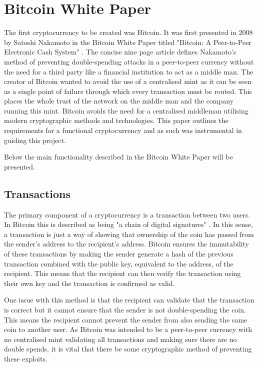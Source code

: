 \documentclass{l4proj}
\begin{document}
\section{Bitcoin White Paper}
The first cryptocurrency to be created was Bitcoin. It was first presented in 2008 by Satoshi Nakamoto in the Bitcoin White Paper
titled "Bitcoin: A Peer-to-Peer Electronic Cash System" \citep{nakamoto2019bitcoin}. The concise nine page article defines Nakamoto's method of preventing
double-spending attacks in a peer-to-peer currency without the need for a third party like a financial institution to 
act as a middle man. The creator of Bitcoin wanted to avoid the use of a centralised mint as it can be seen as a single 
point of failure through which every transaction must be routed. This places the whole trust of the network on the middle 
man and the company running this mint.  Bitcoin avoids the need for a centralised middleman utilising modern cryptographic 
methods and technologies. This paper outlines the requirements for a functional cryptocurrency and as such was instrumental 
in guiding this project.

Below the main functionality described in the Bitcoin White Paper will be presented.


\subsection{Transactions}
The primary component of a cryptocurrency is a transaction between two users. In Bitcoin this is described as being "a
chain of digital signatures" \citep{nakamoto2019bitcoin}. In this sense, a transaction is just a way of showing that ownership of the coin has
passed from the sender's address to the recipient's address. Bitcoin ensures the immutability of these transactions
by making the sender generate a hash of the previous transaction combined with the public key, equivalent to the address,
of the recipient. This means that the recipient can then verify the transaction using their own key and the transaction
is confirmed as valid.

One issue with this method is that the recipient can validate that the transaction is correct but it cannot ensure
that the sender is not double-spending the coin. This means the recipient cannot prevent the sender from also sending the 
same coin to another user. As Bitcoin was intended to be a peer-to-peer currency with no centralised mint validating
all transactions and making sure there are no double spends, it is vital that there be some cryptographic method of
preventing these exploits.
\end{document}
